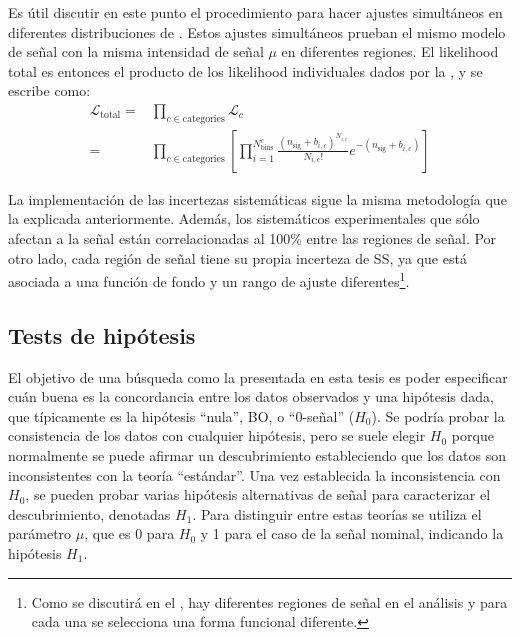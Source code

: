 Es útil discutir en este punto el procedimiento para hacer ajustes simultáneos en diferentes distribuciones de \myj. Estos ajustes simultáneos prueban el mismo modelo de señal con la misma intensidad de señal \(\mu\) en diferentes regiones. El likelihood total es entonces el producto de los likelihood individuales dados por la \Eqn{\ref{eq:strategy:stat_treatment:stat_model:likelihood}}, y se escribe como:
\begin{align}
    \mathcal{L}_{\text{total}} =& \prod_{c\in \text{categories}} \mathcal{L}_c\\
    =& \prod_{c\in \text{categories}} \left[
        \prod_{i=1}^{N^c_{\text{bins}}} \frac{\left( n_{\text{sig}} + b_{i, c} \right)^{N_{i, c}}}{N_{i, c} !} e^{-\left( n_{\text{sig}} + b_{i, c} \right)}
    \right]
\end{align}

La implementación de las incertezas sistemáticas sigue la misma metodología que la explicada anteriormente. Además, los sistemáticos experimentales que sólo afectan a la señal están correlacionadas al 100\% entre las regiones de señal. Por otro lado, cada región de señal tiene su propia incerteza de \ac{SS}, ya que está asociada a una función de fondo y un rango de ajuste diferentes\footnote{Como se discutirá en el \Ch{\ref{ch:bkg}}, hay diferentes regiones de señal en el análisis y para cada una se selecciona una forma funcional diferente.}.








\subsection{Tests de hipótesis}
\label{subsec:strategy:stat_treatment:hypo_test}

El objetivo de una búsqueda como la presentada en esta tesis es poder especificar cuán buena es la concordancia entre los datos observados y una hipótesis dada, que típicamente es la hipótesis \enquote{nula}, \ac{BO}, o \enquote{0-señal} (\(H_0\)). Se podría probar la consistencia de los datos con cualquier hipótesis, pero se suele elegir \(H_0\) porque normalmente se puede afirmar un descubrimiento estableciendo que los datos son inconsistentes con la teoría \enquote{estándar}. Una vez establecida la inconsistencia con \(H_0\), se pueden probar varias hipótesis alternativas de señal para caracterizar el descubrimiento, denotadas \(H_1\). Para distinguir entre estas teorías se utiliza el parámetro \(\mu\), que es 0 para \(H_0\) y 1 para el caso de la señal nominal, indicando la hipótesis \(H_1\).

